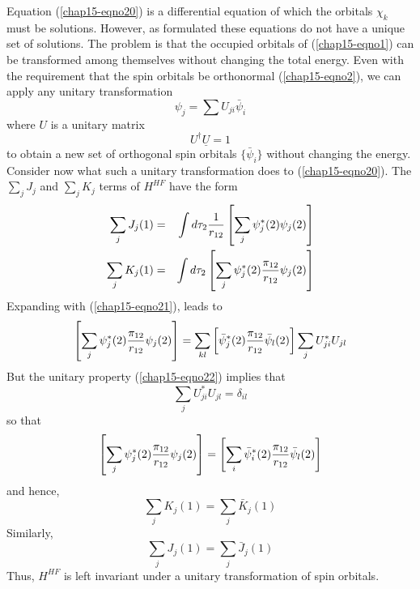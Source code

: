 Equation (\ref{chap15-eqno20}) is a differential equation of which the
orbitals $\chi_k$ must be solutions.  However, as formulated these
equations do not have a unique set of solutions.  The problem is that
the occupied orbitals of (\ref{chap15-eqno1}) can be transformed among
themselves without changing the total energy.  Even with the
requirement that the spin orbitals be orthonormal
(\ref{chap15-eqno2}), we can apply any unitary transformation
\begin{equation}
\psi_j = \sum U_{ji} {\bar{\psi}}_i
\label{chap15-eqno21}
\end{equation}
where $U$ is a unitary matrix
\begin{equation}
U^{\dag} \underline{U} = 1
\label{chap15-eqno22}
\end{equation}
to obtain a new set of orthogonal spin orbitals $\{ {\bar{\psi}}_i\}$
without changing the energy.  Consider now what such a unitary
transformation does to (\ref{chap15-eqno20}).  The $\sum_j J_j$ and
$\sum_j K_j$ terms of $H^{HF}$ have the form
\begin{eqnarray}
\sum_{j} J_j(1) &=& \int d \tau_2 {1 \over r_{12}} \left[ \sum_{j} 
\psi^*_j (2) \psi_j (2) \right]\cr
\sum_{j} K_j (1) &=& \int d \tau_2 \left[ \sum_{j} \psi^*_j (2) 
{\pi_{12} \over r_{12}} \psi_j (2) \right]
\label{chap15-eqno23}
\end{eqnarray}
Expanding with (\ref{chap15-eqno21}), leads to
\begin{equation}
\left[ \sum_{j} \psi^*_j(2) {\pi_{12} \over r_{12}} \psi_j (2) 
\right] = \sum_{kl} \left[ {\bar{\psi}}^*_j (2) {\pi_{12} \over 
r_{12}} {\bar{\psi}}_l(2) \right] \sum_{j} U^*_{ji} U_{jl}
\end{equation}
But the unitary property (\ref{chap15-eqno22}) implies that
\begin{equation}
\sum_{j} U^*_{ji} U_{jl} = \delta_{il}
\end{equation}
so that
\begin{equation}
\left[ \sum_{j} \psi^*_j (2) {\pi_{12} \over r_{12}} \psi_j (2) 
\right] = \left[ \sum_{i} {\bar{\psi}}^*_i (2) {\pi_{12} \over 
r_{12}} {\bar{\psi}}_l(2)\right]
\end{equation}
and hence,
\begin{equation}
\sum_{j} K_j (1) = \sum_{j} {\bar{K}}_j (1)
\end{equation}
Similarly,
\begin{equation}
\sum_{j} J_j (1) = \sum_{j} {\bar{J}}_j(1)
\end{equation}
Thus, $H^{HF}$ is left invariant under a unitary transformation of spin 
orbitals.


